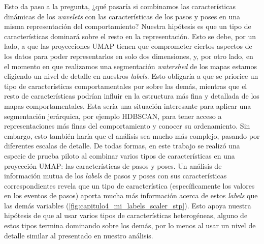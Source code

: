 Esto da paso a la pregunta, ¿qué pasaría si combinamos las características dinámicas de los \textit{wavelets} con las características de los pasos y poses en una misma representación del comportamiento? Nuestra hipótesis es que un tipo de características dominará sobre el resto en la representación. Esto se debe, por un lado, a que las proyecciones UMAP tienen que comprometer ciertos aspectos de los datos para poder representarlos en solo dos dimensiones, y, por otro lado, en el momento en que realizamos una segmentación \textit{watershed} de los mapas estamos eligiendo un nivel de detalle en nuestros \textit{labels}. Esto obligaría a que se priorice un tipo de características comportamentales por sobre las demás, mientras que el resto de características podrían influir en la estructura más fina y detallada de los mapas comportamentales. Esta sería una situación interesante para aplicar una segmentación jerárquica, por ejemplo HDBSCAN, para tener acceso a representaciones más finas del comportamiento y conocer su ordenamiento. Sin embargo, esto también haría que el análisis sea mucho más complejo, pasando por diferentes escalas de detalle. De todas formas, en este trabajo se realizó una especie de prueba piloto al combinar varios tipos de características en una proyección UMAP: las características de pasos y poses. Un análisis de información mutua de los \textit{labels} de pasos y poses con sus características correspondientes revela que un tipo de característica (específicamente los valores en los eventos de pasos) aporta mucha más información acerca de estos \textit{labels} que las demás variables (\autoref{fig:capitulo4_mi_labels_scaler_stp}). Esto apoya nuestra hipótesis de que al usar varios tipos de características heterogéneas, alguno de estos tipos termina dominando sobre los demás, por lo menos al usar un nivel de detalle similar al presentado en nuestro análisis.

